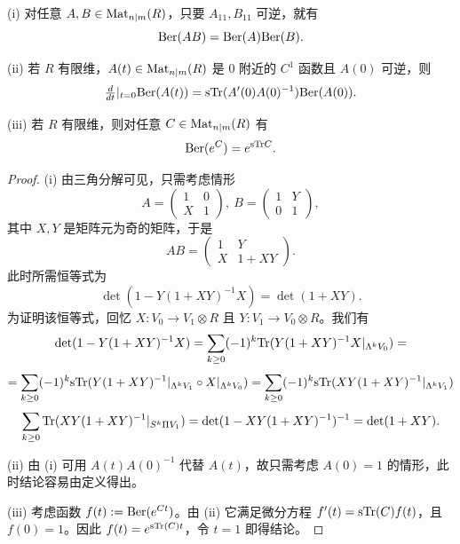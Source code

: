 \begin{proposition} (i) 对任意 $A,B\in {\rm Mat}_{n|m}(R)$，只要 $A_{11},B_{11}$ 可逆，就有
$$
{\rm Ber}(AB)={\rm Ber}(A){\rm Ber}(B).
$$

(ii) 若 $R$ 有限维，$A(t)\in {\rm Mat}_{n|m}(R)$ 是 $0$ 附近的 $C^1$ 函数且 $A(0)$ 可逆，则
$$
\tfrac{d}{dt}|_{t=0}{\rm Ber}(A(t))={\rm sTr}(A'(0)A(0)^{-1}){\rm Ber}(A(0)).
$$

(iii) 若 $R$ 有限维，则对任意 $C\in {\rm Mat}_{n|m}(R)$ 有
$$
{\rm Ber}(e^C)=e^{{\rm sTr}C}.
$$
\end{proposition}

\begin{proof} (i) 由三角分解可见，只需考虑情形
$$
A=\begin{pmatrix} 1 & 0\\ X &1\end{pmatrix},\ 
B=\begin{pmatrix} 1 & Y\\ 0 &1\end{pmatrix},
$$
其中 $X,Y$ 是矩阵元为奇的矩阵，于是
$$
AB=\begin{pmatrix} 1 & Y\\ X &1+XY\end{pmatrix}.
$$
此时所需恒等式为
$$
\det(1-Y(1+XY)^{-1}X)=\det(1+XY).
$$
为证明该恒等式，回忆 $X: V_0\to V_1\otimes R$ 且 $Y: V_1\to V_0\otimes R$。我们有 \scriptsize
$$
\det(1-Y(1+XY)^{-1}X)=\sum_{k\ge 0}(-1)^k {\rm Tr}(Y(1+XY)^{-1}X|_{\Lambda^k V_0})=
$$
$$
=\sum_{k\ge 0}(-1)^k{\rm sTr}(Y(1+XY)^{-1}|_{\Lambda^kV_1}\circ X|_{\Lambda^kV_0})=\sum_{k\ge 0}(-1)^k{\rm sTr}(XY(1+XY)^{-1}|_{\Lambda^kV_1})
$$
$$
\sum_{k\ge 0}{\rm Tr}(XY(1+XY)^{-1}|_{S^k\Pi V_1})=\det(1-XY(1+XY)^{-1})^{-1}=\det(1+XY).
$$ \normalsize

(ii) 由 (i) 可用 $A(t)A(0)^{-1}$ 代替 $A(t)$，故只需考虑 $A(0)=1$ 的情形，此时结论容易由定义得出。

(iii) 考虑函数 $f(t):={\rm Ber}(e^{Ct})$。由 (ii) 它满足微分方程 $f'(t)={\rm sTr}(C)f(t)$，且 $f(0)=1$。因此 $f(t)=e^{{\rm sTr}(C)t}$，令 $t=1$ 即得结论。
\end{proof}



